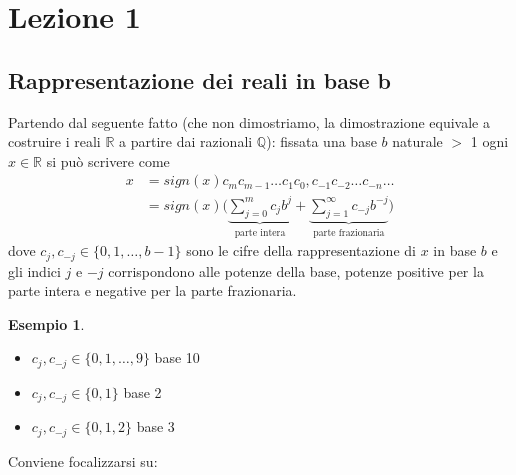 \documentclass[12pt]{article}
\newtheorem*{esempio}{Esempio}
\begin{document}
\section*{Lezione 1}
\subsection*{Rappresentazione dei reali in base b}
Partendo dal seguente fatto (che non dimostriamo, la dimostrazione equivale a costruire i reali $\mathbb{R}$ a partire dai razionali $\mathbb{Q}$): fissata una base $b$ naturale $>$ 1 ogni $x \in \mathbb{R}$ si può scrivere come
\[ \begin{split}
    x & = sign(x)c_mc_{m-1} \dotsc c_1c_0,c_{-1}c_{-2} \dotsc c_{-n} \dotsc \\
    & = sign(x) \biggl( \underbrace{\sum_{j=0}^m c_j b^j}_{\text {parte intera}} + %
    \underbrace{\sum_{j=1}^\infty c_{-j} b^{-j}}_{\text {parte frazionaria}} \biggr) 
\end{split} \]
dove $c_j,c_{-j} \in \{0,1,\dotsc,b-1\}$ sono le cifre della rappresentazione di $x$ in base $b$ e gli indici $j$ e $-j$ corrispondono alle potenze della base, potenze positive per la parte intera e negative per la parte frazionaria.

\begin{esempio} \end{esempio}
\begin{itemize}
    \item $c_j,c_{-j} \in \{0,1,\dotsc,9\}$ base 10
    \item $c_j,c_{-j} \in \{0,1\}$ base 2
    \item $c_j,c_{-j} \in \{0,1,2\}$ base 3
\end{itemize}
Conviene focalizzarsi su:
\end{document}
